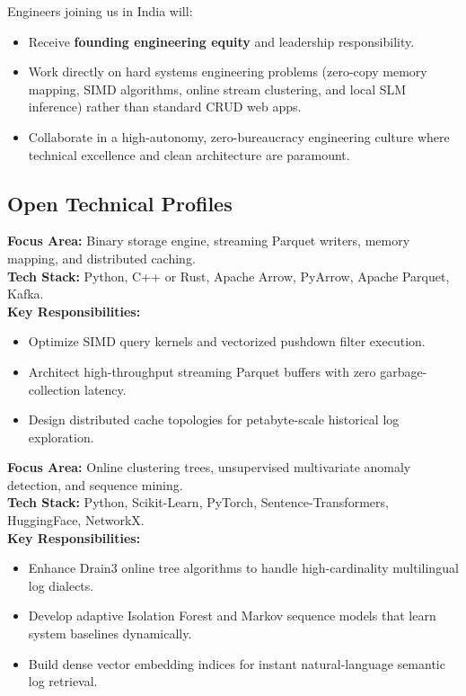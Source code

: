 \documentclass[11pt,a4paper]{article}
\begin{document}
Engineers joining us in India will:
\begin{itemize}[leftmargin=*]
    \item Receive \textbf{founding engineering equity} and leadership responsibility.
    \item Work directly on hard systems engineering problems (zero-copy memory mapping, SIMD algorithms, online stream clustering, and local SLM inference) rather than standard CRUD web apps.
    \item Collaborate in a high-autonomy, zero-bureaucracy engineering culture where technical excellence and clean architecture are paramount.
\end{itemize}

\subsection{Open Technical Profiles}

\begin{featurebox}
\textbf{Focus Area:} Binary storage engine, streaming Parquet writers, memory mapping, and distributed caching.\\
\textbf{Tech Stack:} Python, C++ or Rust, Apache Arrow, PyArrow, Apache Parquet, Kafka.\\
\textbf{Key Responsibilities:}
\begin{itemize}[leftmargin=*]
    \item Optimize SIMD query kernels and vectorized pushdown filter execution.
    \item Architect high-throughput streaming Parquet buffers with zero garbage-collection latency.
    \item Design distributed cache topologies for petabyte-scale historical log exploration.
\end{itemize}
\end{featurebox}

\begin{featurebox}
\textbf{Focus Area:} Online clustering trees, unsupervised multivariate anomaly detection, and sequence mining.\\
\textbf{Tech Stack:} Python, Scikit-Learn, PyTorch, Sentence-Transformers, HuggingFace, NetworkX.\\
\textbf{Key Responsibilities:}
\begin{itemize}[leftmargin=*]
    \item Enhance Drain3 online tree algorithms to handle high-cardinality multilingual log dialects.
    \item Develop adaptive Isolation Forest and Markov sequence models that learn system baselines dynamically.
    \item Build dense vector embedding indices for instant natural-language semantic log retrieval.
\end{itemize}
\end{featurebox}
\end{document}
